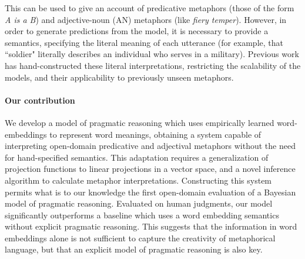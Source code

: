 \documentclass[9pt,twocolumn,twoside,lineno]{pnas-new}
\begin{document}

	


	
% 

	This can be used to give an account of predicative metaphors (those of the form \emph{A is a B}) and adjective-noun (AN) metaphors (like \emph{fiery temper}). However, in order to generate predictions from the model, it is necessary to provide a semantics, specifying the literal meaning of each utterance (for example, that ``soldier" literally describes an individual who serves in a military). Previous work has hand-constructed these literal interpretations, restricting the scalability of the models, and their applicability to previously unseen metaphors.

	\paragraph{Our contribution} 


	We develop a model of pragmatic reasoning which uses empirically learned word-embeddings \cite{mikolov2013distributed,pennington2014glove} to represent word meanings, obtaining a system capable of interpreting open-domain predicative and adjectival metaphors without the need for hand-specified semantics. 
	This adaptation requires a generalization of projection functions to linear projections in a vector space, and a novel inference algorithm to calculate metaphor interpretations.
	Constructing this system permits what is to our knowledge the first open-domain evaluation of a Bayesian model of pragmatic reasoning.
	Evaluated on human judgments, our model significantly outperforms a baseline which uses a word embedding semantics without explicit pragmatic reasoning. This suggests that the information in word embeddings alone is not sufficient to capture the creativity of metaphorical language, but that an explicit model of pragmatic reasoning is also key.
\end{document}
